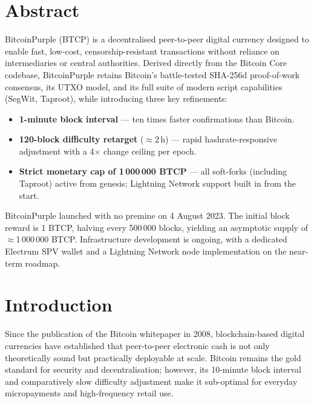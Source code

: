 \documentclass[12pt, a4paper]{article}
\begin{document}
\section*{Abstract}

BitcoinPurple (BTCP) is a decentralised peer-to-peer digital currency designed
to enable fast, low-cost, censorship-resistant transactions without reliance on
intermediaries or central authorities.  Derived directly from the Bitcoin Core
codebase, BitcoinPurple retains Bitcoin's battle-tested SHA-256d proof-of-work
consensus, its UTXO model, and its full suite of modern script capabilities
(SegWit, Taproot), while introducing three key refinements:

\begin{itemize}[noitemsep]
  \item \textbf{1-minute block interval} — ten times faster confirmations than
        Bitcoin.
  \item \textbf{120-block difficulty retarget} (\(\approx\)2\,h) — rapid
        hashrate-responsive adjustment with a 4$\times$ change ceiling per epoch.
  \item \textbf{Strict monetary cap of 1\,000\,000 BTCP} — all soft-forks
        (including Taproot) active from genesis; Lightning Network support built
        in from the start.
\end{itemize}

BitcoinPurple launched with no premine on 4 August 2023.  The initial block
reward is 1 BTCP, halving every 500\,000 blocks, yielding an asymptotic supply
of \(\approx\)1\,000\,000 BTCP.  Infrastructure development is ongoing, with a
dedicated Electrum SPV wallet and a Lightning Network node implementation on the
near-term roadmap.

\newpage
\section{Introduction}

Since the publication of the Bitcoin whitepaper in 2008, blockchain-based
digital currencies have established that peer-to-peer electronic cash is not
only theoretically sound but practically deployable at scale.  Bitcoin remains
the gold standard for security and decentralisation; however, its 10-minute
block interval and comparatively slow difficulty adjustment make it sub-optimal
for everyday micropayments and high-frequency retail use.
\end{document}
